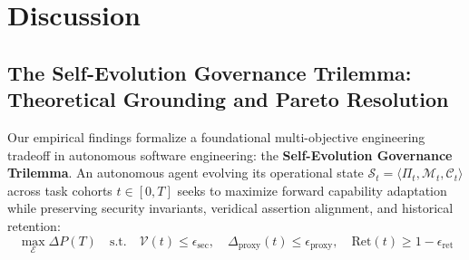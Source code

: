 \documentclass[conference]{IEEEtran}
\begin{document}



\section{Discussion}
\label{sec:discussion}

\subsection{The Self-Evolution Governance Trilemma: Theoretical Grounding and Pareto Resolution}
\label{sec:trilemma}
Our empirical findings formalize a foundational multi-objective engineering tradeoff in autonomous software engineering: the \textbf{Self-Evolution Governance Trilemma}. An autonomous agent evolving its operational state $\mathcal{S}_t = \langle \Pi_t, \mathcal{M}_t, \mathcal{C}_t \rangle$ across task cohorts $t \in [0, T]$ seeks to maximize forward capability adaptation while preserving security invariants, veridical assertion alignment, and historical retention:
\begin{equation}
\max_{\mathcal{E}} \Delta P(T) \quad \text{s.t.} \quad \mathcal{V}(t) \le \epsilon_{\text{sec}}, \quad \Delta_{\text{proxy}}(t) \le \epsilon_{\text{proxy}}, \quad \text{Ret}(t) \ge 1 - \epsilon_{\text{ret}}
\end{equation}
\end{document}
